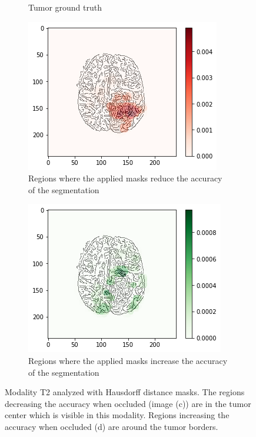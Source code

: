 \begin{figure}[H]
\begin{subfigure}[t]{.4\textwidth}
        \caption{Tumor ground truth}
    \end{subfigure}
    \begin{subfigure}[t]{.45\textwidth}
        \centering
        \includegraphics[width=\linewidth]{chapters/06_hdm/b_Brats18_TCIA08_242_1_L2/33.png}
        \caption{Regions where the applied masks reduce the accuracy of the segmentation}
    \end{subfigure}\hspace{1cm}%
    \begin{subfigure}[t]{.45\textwidth}
        \centering
        \includegraphics[width=\linewidth]{chapters/06_hdm/b_Brats18_TCIA08_242_1_L2/34.png}
        \caption{Regions where the applied masks increase the accuracy of the segmentation}
    \end{subfigure}
    \caption{Modality T2 analyzed with Hausdorff distance masks. The regions decreasing the accuracy when occluded (image (c)) are in the tumor center which is visible in this modality. Regions increasing the accuracy when occluded (d) are around the tumor borders.}
    \label{brats_tcia08_t2}
\end{figure}

